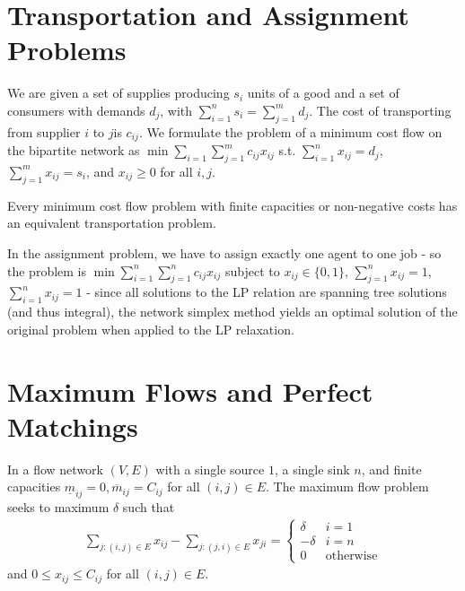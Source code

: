 \section{Transportation and Assignment Problems}
\label{sec:transp-assignm-probl}

\begin{defn}
  \label{sec:transp-assignm-probl-1}
  We are given a set of supplies producing $s_{i}$ units of a good and
  a set of consumers with demands $d_{j}$, with $\sum_{i=1}^{n} s_{i}
  = \sum_{j=1}^{m} d_{j}$.  The cost of transporting  from supplier
  $i$ to $j$is $c_{ij}$.  We formulate the problem of a minimum cost
  flow on the bipartite network as $\min \sum_{i=1}^{} \sum_{j=1}^{m}
  c_{ij} x_{ij}$ s.t. $\sum_{i=1}^{n} x_{ij} = d_{j}$, $\sum_{j=1}^{m}
  x_{ij} = s_{i}$, and $x_{ij} \geq 0$ for all $i, j$.
\end{defn}

\begin{thm}
  \label{sec:transp-assignm-probl-2}
  Every minimum cost flow problem with finite capacities or
  non-negative costs has an equivalent transportation problem.
\end{thm}


\begin{thm}
  \label{sec:transp-assignm-probl-3}
  In the assignment problem, we have to assign exactly one agent to
  one job - so the problem is $\min \sum_{i=1}^{n} \sum_{j=1}^{n}
  c_{ij} x_{ij}$ subject to $x_{ij} \in \{ 0, 1 \}$, $\sum_{j=1}^{n}
  x_{ij} = 1$, $\sum_{i=1}^{n} x_{ij} = 1$ - since all solutions to
  the LP relation are spanning tree solutions (and thus integral), the
  network simplex method yields an optimal solution of the original
  problem when applied to the LP relaxation.
\end{thm}

\section{Maximum Flows and Perfect Matchings}
\label{sec:maxim-flows-perf}

\begin{defn}
  \label{sec:maxim-flows-perf-1}
  In a flow network $(V, E)$ with a single source $1$, a single sink
  $n$, and finite capacities $\underline m_{ij} = 0, \overline m_{ij} = C_{ij}$ for all $(i,
  j) \in E$.    The maximum flow problem seeks to maximum $\delta$
  such that
  \begin{align}
    \label{eq:8}
    \sum_{j: (i, j) \in E}^{} x_{ij} - \sum_{j: (j, i) \in E}^{}
    x_{ji} =
    \begin{cases}
      \delta & i = 1 \\
      -\delta & i = n \\
      0 & \text{otherwise}
    \end{cases}
  \end{align} and $0 \leq x_{ij} \leq C_{ij}$ for all $(i, j) \in E$.
\end{defn}

